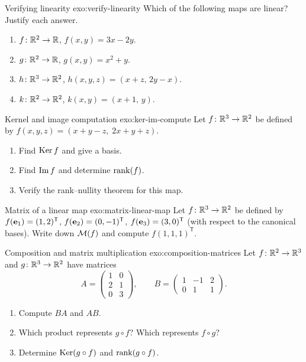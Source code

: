 \begin{exercise}{Verifying linearity \basic}{exo:verify-linearity}
Which of the following maps are linear? Justify each answer.
\begin{enumerate}[label=(\alph*)]
  \item $f\colon{\mathbb{R}}^2\to{\mathbb{R}}$, $f(x,y) = 3x - 2y$.
  \item $g\colon{\mathbb{R}}^2\to{\mathbb{R}}$, $g(x,y) = x^2 + y$.
  \item $h\colon{\mathbb{R}}^3\to{\mathbb{R}}^2$, $h(x,y,z) = (x+z,\, 2y-x)$.
  \item $k\colon{\mathbb{R}}^2\to{\mathbb{R}}^2$, $k(x,y) = (x+1,\, y)$.
\end{enumerate}
\end{exercise}

\begin{exercise}{Kernel and image computation \basic}{exo:ker-im-compute}
Let $f\colon{\mathbb{R}}^3\to{\mathbb{R}}^2$ be defined by $f(x,y,z) = (x+y-z,\; 2x+y+z)$.
\begin{enumerate}[label=(\alph*)]
  \item Find $\operatorname{Ker} f$ and give a basis.
  \item Find $\operatorname{Im} f$ and determine $\operatorname{rank}(f)$.
  \item Verify the rank--nullity theorem for this map.
\end{enumerate}
\end{exercise}

\begin{exercise}{Matrix of a linear map \basic}{exo:matrix-linear-map}
Let $f\colon{\mathbb{R}}^3\to{\mathbb{R}}^2$ be defined by
$f(\mathbf{e}_{1}) = (1,2)^{\mathsf{T}}$,
$f(\mathbf{e}_{2}) = (0,-1)^{\mathsf{T}}$,
$f(\mathbf{e}_{3}) = (3,0)^{\mathsf{T}}$
(with respect to the canonical bases). Write down $\mathcal{M}(f)$ and
compute $f(1,1,1)^{\mathsf{T}}$.
\end{exercise}

\begin{exercise}{Composition and matrix multiplication \intermediate}%
{exo:composition-matrices}
Let $f\colon{\mathbb{R}}^2\to{\mathbb{R}}^3$ and $g\colon{\mathbb{R}}^3\to{\mathbb{R}}^2$ have matrices
\[
  A = \begin{pmatrix}1&0\\2&1\\0&3\end{pmatrix}, \qquad
  B = \begin{pmatrix}1&-1&2\\0&1&1\end{pmatrix}.
\]
\begin{enumerate}[label=(\alph*)]
  \item Compute $BA$ and $AB$.
  \item Which product represents $g\circ f$? Which represents $f\circ g$?
  \item Determine $\operatorname{Ker}(g\circ f)$ and $\operatorname{rank}(g\circ f)$.
\end{enumerate}
\end{exercise}

